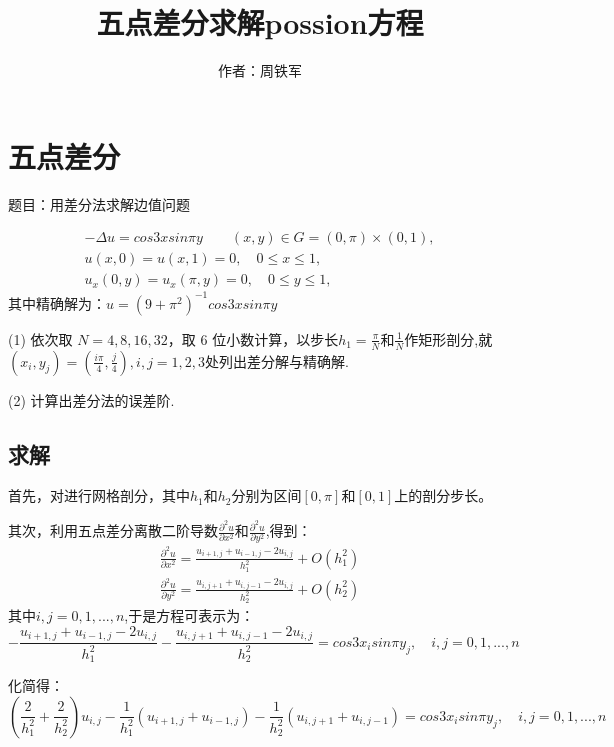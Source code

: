 \documentclass[12pt,a4paper]{article}
\title{五点差分求解possion方程}
\author{作者：周铁军}
\date{\chntoday}
\begin{document}
\maketitle
\newpage
\section{五点差分}
 题目：用差分法求解边值问题
 
 \begin{equation}
  \begin{array}{l}{-\Delta u = cos{3x}sin{\pi y} \qquad (x,y) \in G=(0,\pi)\times(0,1),}\\
  {u(x,0) = u(x,1)=0,\quad 0 \leq x \leq 1, }\\
  {u_x(0,y) = u_x(\pi,y)=0,\quad 0 \leq y \leq 1, }\end{array}
 \end{equation}
其中精确解为：$u = (9+\pi^2)^{-1}cos{3x}sin{\pi y}$

(1) 依次取 $N = 4,8,16,32$，取 $6$ 位小数计算，以步长$h_1 = \frac{\pi}{N}$和$\frac{1}{N}$作矩形剖分,就$(x_i,y_j)=(\frac{i\pi}{4},\frac{j}{4}),i,j=1,2,3$处列出差分解与精确解.

(2) 计算出差分法的误差阶.

\subsection{求解}
首先，对进行网格剖分，其中$h_1$和$h_2$分别为区间$[0,\pi]$和$[0,1]$上的剖分步长。

其次，利用五点差分离散二阶导数$\frac{\partial^2 u}{\partial x^2}$和$\frac{\partial^2 u}{\partial y^2}$,得到：
\begin{equation}
\begin{array}{l}{\frac{\partial^2 u}{\partial x^2} = \frac{u_{i+1,j}+u_{i-1,j}-2u_{i,j}}{h_1^2} + O(h_1^2)}\\
{\frac{\partial^2 u}{\partial y^2} = \frac{u_{i,j+1}+u_{i,j-1}-2u_{i,j}}{h_2^2}+ O(h_2^2)}\end{array}
\end{equation}
其中$i,j=0,1,...,n$,于是方程可表示为：
$$-\frac{u_{i+1,j}+u_{i-1,j}-2u_{i,j}}{h_1^2}-\frac{u_{i,j+1}+u_{i,j-1}-2u_{i,j}}{h_2^2} = cos{3x_i}sin{\pi y_j},\quad i,j=0,1,...,n$$

化简得：
$$(\frac{2}{h_1^2}+\frac{2}{h_2^2})u_{i,j}-\frac{1}{h_1^2}(u_{i+1,j}+u_{i-1,j})-\frac{1}{h_2^2}(u_{i,j+1}+u_{i,j-1}) = cos{3x_i}sin{\pi y_j},\quad i,j=0,1,...,n$$
\end{document}
